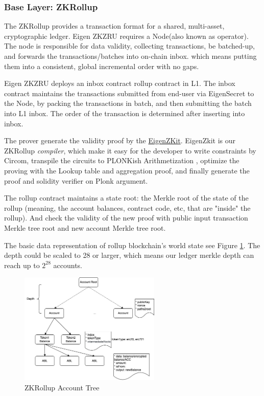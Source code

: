 \documentclass{article}
\begin{document}
\subsubsection{Base Layer: ZKRollup}

The ZKRollup provides a transaction format for a shared, multi-asset, cryptographic ledger. Eigen ZKZRU requires a Node(also known as operator). The node is responsible for data validity, collecting transactions, be batched-up, and forwards the transactions/batches into on-chain inbox. which means putting them into a consistent, global incremental order with no gaps. 

Eigen ZKZRU deploys an inbox contract rollup contract in L1. The inbox contract maintains the transactions submitted from end-user via EigenSecret to the Node, by packing the transactions in batch, and then submitting the batch into L1 inbox. The order of the transaction is determined after inserting into inbox. 

The prover generate the validity proof by the \href{https://github.com/ieigen/EigenZKit}{EigenZKit}. EigenZkit is our ZKRollup \textit{compiler}, which make it easy for the developer to write constraints by Circom, transpile the circuits to PLONKish Arithmetization \cite{gabizon2019plonk}, optimize the proving with the Lookup table and aggregation proof, and finally generate the proof and solidity verifier on Plonk argument. 

The rollup contract maintains a state root: the Merkle root of the state of the rollup (meaning, the account balances, contract code, etc, that are "inside" the rollup). And check the validity of the new proof with public input transaction Merkle tree root and new account Merkle tree root.

The basic data representation of rollup blockchain's world state see Figure \ref{fig:zkzru}. The depth could be scaled to 28 or larger, which means our ledger merkle depth can reach up to $2^{28}$ accounts.

\begin{figure}
    \centering
    \includegraphics[width=0.6\textwidth]{zkzru.drawio.png}
    \caption{\label{fig:zkzru}ZKRollup Account Tree}
\end{figure}
\end{document}
